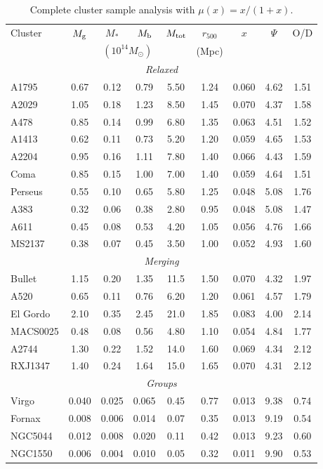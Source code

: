 \begin{table}[h]
\centering
\caption{Complete cluster sample analysis with $\mu(x) = x/(1+x)$.}\label{tab:full-cluster}
\scriptsize
\setlength{\tabcolsep}{1.5pt}
\renewcommand{\arraystretch}{1.0}
\begin{tabular}{lcccccccc}
\toprule
Cluster & $M_{\rm g}$ & $M_*$ & $M_{\rm b}$ & $M_{\rm tot}$ & $r_{500}$ & $x$ & $\Psi$ & O/D \\
 & \multicolumn{4}{c}{$(10^{14}M_\odot)$} & (Mpc) & & & \\
\midrule
\multicolumn{9}{c}{\textit{Relaxed}} \\
A1795 & 0.67 & 0.12 & 0.79 & 5.50 & 1.24 & 0.060 & 4.62 & 1.51 \\
A2029 & 1.05 & 0.18 & 1.23 & 8.50 & 1.45 & 0.070 & 4.37 & 1.58 \\
A478 & 0.85 & 0.14 & 0.99 & 6.80 & 1.35 & 0.063 & 4.51 & 1.52 \\
A1413 & 0.62 & 0.11 & 0.73 & 5.20 & 1.20 & 0.059 & 4.65 & 1.53 \\
A2204 & 0.95 & 0.16 & 1.11 & 7.80 & 1.40 & 0.066 & 4.43 & 1.59 \\
Coma & 0.85 & 0.15 & 1.00 & 7.00 & 1.40 & 0.059 & 4.64 & 1.51 \\
Perseus & 0.55 & 0.10 & 0.65 & 5.80 & 1.25 & 0.048 & 5.08 & 1.76 \\
A383 & 0.32 & 0.06 & 0.38 & 2.80 & 0.95 & 0.048 & 5.08 & 1.47 \\
A611 & 0.45 & 0.08 & 0.53 & 4.20 & 1.05 & 0.056 & 4.76 & 1.66 \\
MS2137 & 0.38 & 0.07 & 0.45 & 3.50 & 1.00 & 0.052 & 4.93 & 1.60 \\
\midrule
\multicolumn{9}{c}{\textit{Merging}} \\
Bullet & 1.15 & 0.20 & 1.35 & 11.5 & 1.50 & 0.070 & 4.32 & 1.97 \\
A520 & 0.65 & 0.11 & 0.76 & 6.20 & 1.20 & 0.061 & 4.57 & 1.79 \\
El Gordo & 2.10 & 0.35 & 2.45 & 21.0 & 1.85 & 0.083 & 4.00 & 2.14 \\
MACS0025 & 0.48 & 0.08 & 0.56 & 4.80 & 1.10 & 0.054 & 4.84 & 1.77 \\
A2744 & 1.30 & 0.22 & 1.52 & 14.0 & 1.60 & 0.069 & 4.34 & 2.12 \\
RXJ1347 & 1.40 & 0.24 & 1.64 & 15.0 & 1.65 & 0.070 & 4.31 & 2.12 \\
\midrule
\multicolumn{9}{c}{\textit{Groups}} \\
Virgo & 0.040 & 0.025 & 0.065 & 0.45 & 0.77 & 0.013 & 9.38 & 0.74 \\
Fornax & 0.008 & 0.006 & 0.014 & 0.07 & 0.35 & 0.013 & 9.19 & 0.54 \\
NGC5044 & 0.012 & 0.008 & 0.020 & 0.11 & 0.42 & 0.013 & 9.23 & 0.60 \\
NGC1550 & 0.006 & 0.004 & 0.010 & 0.05 & 0.32 & 0.011 & 9.90 & 0.53 \\
\bottomrule
\end{tabular}
\end{table}

